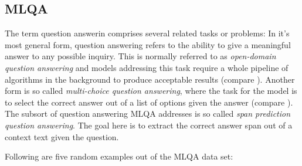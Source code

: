 \subsection{MLQA}

The term question answerin comprises several related tasks or problems: In it's most general form,
question answering refers to the ability to give a meaningful answer to any possible inquiry. This is
normally referred to as \emph{open-domain question answering} and models addressing this task require
a whole pipeline of algorithms in the background to produce acceptable results (compare \cite{chen-yih-2020-open}).
Another form is so called \emph{multi-choice question answering}, where the task for the model is to select the correct
answer out of a list of options given the answer (compare \cite{welbl2017crowdsourcing}).
The subsort of question answering MLQA addresses is so called \emph{span prediction question answering}.
The goal here is to extract the correct answer span out of a context text given the question.

Following are five random examples out of the MLQA data set:

